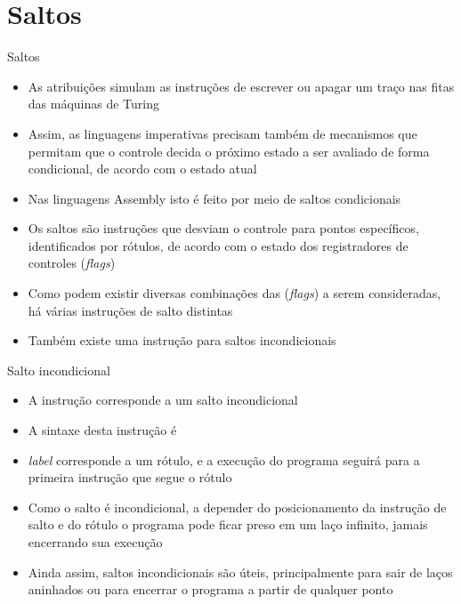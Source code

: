 \section{Saltos}

\begin{frame}[fragile]{Saltos}

    \begin{itemize}
        \item As atribuições simulam as instruções de escrever ou apagar um traço nas fitas das
            máquinas de Turing

        \item Assim, as linguagens imperativas precisam também de mecanismos que permitam que o
            controle decida o próximo estado a ser avaliado de forma condicional, de acordo com o
            estado atual

        \item Nas linguagens Assembly isto é feito por meio de saltos condicionais

        \item Os saltos são instruções que desviam o controle para pontos específicos, 
            identificados por rótulos, de acordo com o estado dos registradores de controles
            ({\it flags})

        \item Como podem existir diversas combinações das (\textit{flags}) a serem
            consideradas, há várias instruções de salto distintas

        \item Também existe uma instrução para saltos incondicionais
    \end{itemize}

\end{frame}

\begin{frame}[fragile]{Salto incondicional}

    \begin{itemize}
        \item A instrução  corresponde a um salto incondicional

        \item A sintaxe desta instrução é


        \item \textit{label} corresponde a um rótulo, e a execução do programa seguirá para a
            primeira instrução que segue o rótulo

        \item Como o salto é incondicional, a depender do posicionamento da instrução de salto e
            do rótulo o programa pode ficar preso em um laço infinito, jamais encerrando sua
            execução

        \item Ainda assim, saltos incondicionais são úteis, principalmente para sair de laços 
            aninhados ou para encerrar o programa a partir de qualquer ponto
    \end{itemize}

\end{frame}

